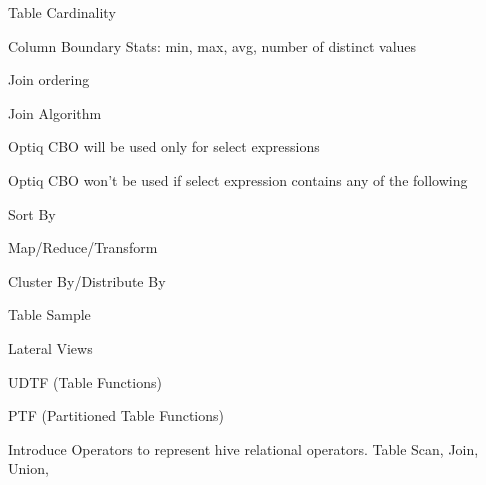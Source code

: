 \documentclass{vldb}
\newcommand{\ii}{\item}
\begin{document}
\ii Table Cardinality
\ii Column Boundary Stats: min, max, avg, number of distinct values
\ii Join ordering
\ii Join Algorithm
\ii Optiq CBO will be used only for select expressions
\ii Optiq CBO won’t be used if select expression contains any of the following
\ii Sort By
\ii Map/Reduce/Transform
\ii Cluster By/Distribute By
\ii Table Sample
\ii Lateral Views
\ii UDTF (Table Functions)
\ii PTF (Partitioned Table Functions)
\ii Introduce Operators to represent hive relational operators. Table Scan, Join, Union,
\end{document}
